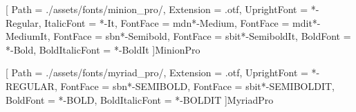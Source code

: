 \graphicspath{{./assets/img}}


\newcommand{\HRule}[1]{\rule{\linewidth}{#1}}

\newcommand{\ColorBox}[3]{\textcolor{#1}{\rule{#2}{#3}}}




\newfontfamily{\MinionPro}[
    Path           = {./assets/fonts/minion_pro/},
    Extension      = .otf,
    UprightFont    = *-Regular,
    ItalicFont     = *-It,
    FontFace       = {md}{n}{*-Medium},
    FontFace       = {md}{it}{*-MediumIt},
    FontFace       = {sb}{n}{*-Semibold},
    FontFace       = {sb}{it}{*-SemiboldIt},
    BoldFont       = *-Bold,
    BoldItalicFont = *-BoldIt
]{MinionPro}

\newfontfamily{\MyriadPro}[
    Path           = {./assets/fonts/myriad_pro/},
    Extension      = .otf,
    UprightFont    = *-REGULAR,
    FontFace       = {sb}{n}{*-SEMIBOLD},
    FontFace       = {sb}{it}{*-SEMIBOLDIT},
    BoldFont       = *-BOLD,
    BoldItalicFont = *-BOLDIT
]{MyriadPro}

\newcommand{\FontVariant}[1]{\fontseries{#1}\selectfont}